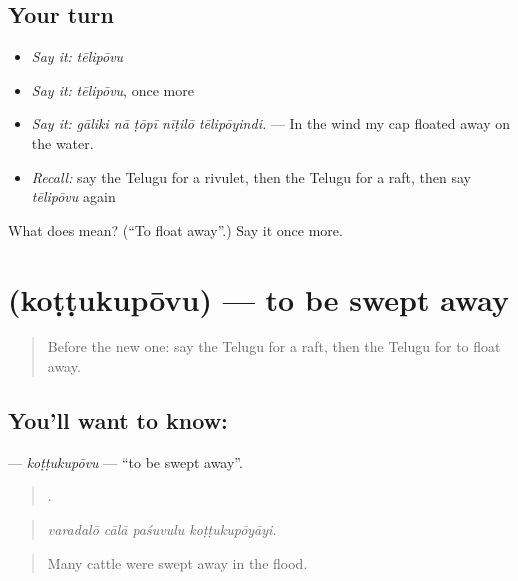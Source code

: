 \subsection*{Your turn}
\begin{itemize}
\raggedright
  \item \emph{Say it:} \emph{tēlipōvu}
  \item \emph{Say it:} \emph{tēlipōvu}, once more
  \item \emph{Say it:} \emph{gāliki nā ṭōpī nīṭilō tēlipōyindi.} — In the wind my cap floated away on the water.
  \item \emph{Recall:} say the Telugu for a rivulet, then the Telugu for a raft, then say \emph{tēlipōvu} again
\end{itemize}

\begin{tcolorbox}[breakable,colback=teal!4,colframe=teal!35!black,title={Before you move on}]
What does  mean? (\textquotedblleft{}To float away\textquotedblright{}.) Say it once more.
\end{tcolorbox}
\section[\texorpdfstring{\te{కొట్టుకుపోవు} (koṭṭukupōvu)}{కొట్టుకుపోవు (koṭṭukupōvu)}]{ (koṭṭukupōvu) — to be swept away}

\label{lesson:TE-C453-kottukupovu}



\begin{quote}
Before the new one: say the Telugu for a raft, then the Telugu for to float away.
\end{quote}

\subsection*{You'll want to know: }
\textbf{} — \emph{koṭṭukupōvu} — \textquotedblleft{}to be swept away\textquotedblright{}.

\begin{quote}
   .
\end{quote}

\begin{quote}
\emph{varadalō cālā paśuvulu koṭṭukupōyāyi.}
\end{quote}

\begin{quote}
Many cattle were swept away in the flood.
\end{quote}

